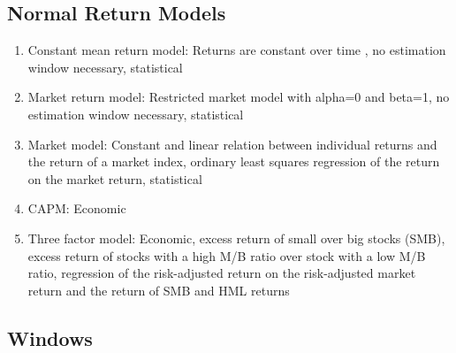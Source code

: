 \documentclass[12pt]{article}
\begin{document}
\subsection{Normal Return Models}

    \begin{enumerate}
        \item Constant mean return model: Returns are constant over time , no estimation window necessary, statistical

        \item Market return model: Restricted market model with alpha=0 and beta=1, no estimation window necessary, statistical

        \item Market model: Constant and linear relation between individual returns and the return of a market index, ordinary least squares regression of the return on the market return, statistical

        \item CAPM: Economic

        \item Three factor model: Economic, excess return of small over big stocks (SMB), excess return of stocks with a high M/B ratio over stock with a low M/B ratio, regression of the risk-adjusted return on the risk-adjusted market return and the return of SMB and HML returns 
    \end{enumerate}



\subsection{Windows}
\end{document}
